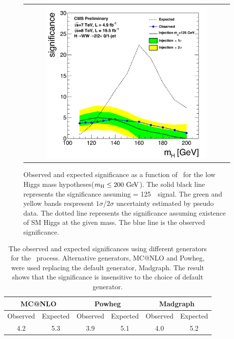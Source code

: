 %
\begin{figure}[htp] 
\centering 
\begin{tabular}{c} 
\includegraphics[width=0.8\textwidth]{figures/signif_allcomb_inj125_data_zoom.pdf} 
\end{tabular} 
\caption{Observed and expected significance as a function of \mHi\ for 
the low Higgs mass hypotheses($m_{\mathrm{H}}\le200~\mathrm{Ge\kern -0.1em V}$). 
The solid black line represents the significance assuming \mHi = 125~\GeV\ signal. 
The green and yellow bands respresent $1\sigma$/$2\sigma$ uncertainty 
estimated by pseudo data. The dotted line represents the significance 
assuming existence of SM Higgs at the given mass. 
The blue line is the observed significance. 
} 
\label{fig:significane_mH} 
\end{figure} 

%
\begin{table}[htp] 
\begin{center} 
\begin{tabular}{cc|cc|cc} 
\hline 
\multicolumn{2}{c|}{MC@NLO}   &  \multicolumn{2}{c|}{Powheg} & \multicolumn{2}{c}{Madgraph} \\
\hline \hline 
Observed & Expected & Observed & Expected &  Observed & Expected \\ 
\hline 
4.2 & 5.3 & 3.9 & 5.1 & 4.0 & 5.2 \\
\hline 
\end{tabular} 
\caption{The observed and expected significances
using different generators for the \qqww\ process. Alternative generators,
MC@NLO and Powheg, were used replacing the default generator, Madgraph.
The result shows that the significance is insensitive to the choice
of default generator.} 
\label{tab:sig_diffgenerator} 
\end{center} 
\end{table} 


